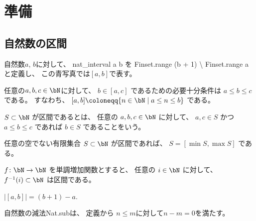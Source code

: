 \chapter{準備}

\section{自然数の区間}

\begin{definition}
\label{df:nat_interval}
\leanok
自然数$a$, $b$に対して、
\textsf{nat\_interval a b}
を
\textsf{Finset.range (b + 1) {\textbackslash} Finset.range a}
と定義し、
この青写真では$[a,b]$で表す。
\end{definition}

\begin{lemma}
\label{lm:nat_interval_mem}
\leanok
任意の$a,b,c \in \bN$に対して、
$
b \in [a, c]
$
であるための必要十分条件は
$
a \le b \le c
$
である。
すなわち、
$
[a, b] \coloneqq \{n \in \bN \mid a \le n \le b\}
$
である。
\end{lemma}

\begin{definition}
\label{df:IsInterval}
\leanok
$
S \subset \bN
$
が区間であるとは、
任意の
$
a, b, c \in \bN
$
に対して、
$
a, c \in S
$
かつ
$
a \le b \le c
$
であれば
$
b \in S
$
であることをいう。
\end{definition}

\begin{lemma}
\label{lm:nonempty_interval_range}
\leanok
任意の空でない有限集合
$
S \subset \bN
$
が区間であれば、
$
S = [\min S, \max S]
$
である。
\end{lemma}

\begin{lemma}
\label{lm:preimage_of_monotone_isInterval}
\leanok
$
f \colon \bN \to \bN
$
を単調増加関数とすると、
任意の
$
i \in \bN
$
に対して、
$
f^{-1}(i) \subset \bN
$
は区間である。
\end{lemma}

\begin{lemma}
\label{lm:nat_interval_card}
\leanok
$
|[a,b]| = (b+1) - a
$.
\end{lemma}

\begin{remark}
自然数の減法\textsf{Nat.sub}は、
定義から
$n \le m$に対して$n-m=0$を満たす。
\end{remark}

